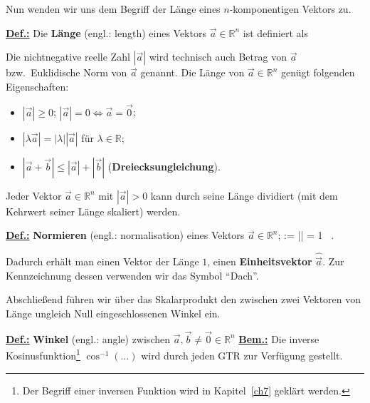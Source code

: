 \medskip
\noindent
Nun wenden wir uns dem Begriff der L\"ange eines $n$-komponentigen
Vektors zu.

\medskip
\noindent
\underline{\bf Def.:} Die {\bf L\"ange} (engl.: length) eines 
Vektors $\vec{a} \in \mathbb{R}^{n}$ ist definiert als
%
\be
{}
\ee
%

\medskip
\noindent
Die nichtnegative reelle Zahl $|\vec{a}|$ wird technisch auch
Betrag von $\vec{a}$ bzw.\ Euklidische Norm
von $\vec{a}$ genannt. Die L\"ange von $\vec{a} \in
\mathbb{R}^{n}$ gen\"ugt folgenden Eigenschaften: 
%
\begin{itemize}
	\item $|\vec{a}| \geq 0$; $|\vec{a}|=0 \Leftrightarrow
	\vec{a}=\vec{0}$;
	\item $|\lambda\vec{a}| = |\lambda||\vec{a}|$ f\"ur $\lambda \in
	{\mathbb R}$;
	\item $|\vec{a}+\vec{b}| \leq |\vec{a}|+|\vec{b}|$
	\hfill ({\bf Dreiecksungleichung}).
\end{itemize}

\medskip
\noindent
Jeder Vektor $\vec{a} \in \mathbb{R}^{n}$ mit $|\vec{a}|>0$
kann durch seine L\"ange dividiert (mit dem Kehrwert seiner
L\"ange skaliert) werden.

\medskip
\noindent
\underline{\bf Def.:}
{\bf Normieren} (engl.: normalisation) eines Vektors $\vec{a} \in
\mathbb{R}^{n}$;
%
\be
{} := 
\qquad\Rightarrow\qquad
|| = 1 \ .
\ee
%

\medskip
\noindent
Dadurch erh\"alt man einen Vektor der L\"ange $1$, einen
{\bf Einheitsvektor} $\hat{\vec{a}}$. Zur Kennzeichnung dessen
verwenden wir das Symbol "`Dach"'.

\medskip
\noindent
Abschlie\ss end f\"uhren wir \"uber das Skalarprodukt
den zwischen zwei Vektoren von L\"ange ungleich Null
eingeschlossenen Winkel ein.

\medskip
\noindent
\underline{\bf Def.:}
{\bf Winkel} (engl.: angle) zwischen $\vec{a},\vec{b} \neq \vec{0}
\in {\mathbb R}^{n}$ 
%
\be
{}
\ee
%
\underline{\bf Bem.:} Die inverse Kosinusfunktion\footnote{Der
Begriff einer inversen Funktion wird in Kapitel~\ref{ch7}
gekl\"art werden.} $\cos^{-1}(\ldots)$ wird durch jeden GTR zur
Verf\"ugung gestellt.

